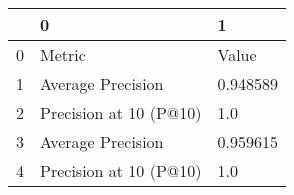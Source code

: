 \begin{tabular}{lll}
\toprule
{} &                       0 &         1 \\
\midrule
0 &                  Metric &     Value \\
1 &       Average Precision &  0.948589 \\
2 &  Precision at 10 (P@10) &       1.0 \\
3 &       Average Precision &  0.959615 \\
4 &  Precision at 10 (P@10) &       1.0 \\
\bottomrule
\end{tabular}
